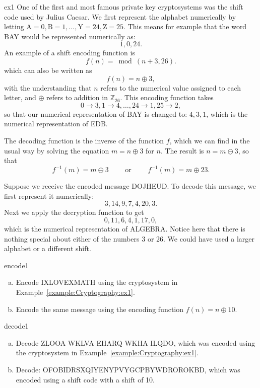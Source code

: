 \begin{example}{ex1}
One of the first and most famous private key cryptosystems was the
shift code used by Julius Caesar.  We first represent the alphabet numerically by
letting $\mbox{A}  = 0, \mbox{B}  = 1, \ldots, \mbox{Y} = 24, \mbox{Z} = 25$. This means for example that the word BAY would be represented numerically as:
$$ 1,0,24.$$
An example of a shift encoding function is
$$
f(n) =\bmod( n + 3,  26).
$$
which can also be written as
$$
f(n) =n \oplus 3,
$$
with the understanding that $n$ refers to the numerical value assigned to each letter, and $\oplus$ refers to addition in $\mathbb{Z}_{26}$. This encoding function takes 
$$0 \rightarrow 3, 1 \rightarrow 4, \ldots, 24 \rightarrow 1,25 \rightarrow 2,$$
so that our numerical representation of BAY is changed to:  $ 4,3,1$, which is the numerical representation of EDB.

The decoding
function is the inverse of the function $f$, which we can find in the usual way by solving the equation $m = n \oplus 3$ for $n$.
The result is $n = m \ominus 3$, so that
$$
f^{-1}(m) = m \ominus 3 \qquad \textrm{ or }\qquad f^{-1}(m) = m \oplus 23.
$$

Suppose we receive the encoded message DOJHEUD. To decode this
message, we first represent it numerically:  
$$
3, 14, 9, 7, 4, 20, 3.
$$
Next we apply the decryption function to get
$$
0, 11, 6, 4, 1, 17, 0,
$$
which is the numerical representation of ALGEBRA. Notice here that there is nothing special about either of
the numbers 3 or 26. We could have used a larger alphabet or a
different shift.
\end{example}

\begin{exercise}{encode1}
\begin{enumerate}[(a)]
\item
Encode IXLOVEXMATH using the cryptosystem in Example~\ref{example:Cryptography:ex1}.
\item
Encode the same message using the encoding function $f(n) =n \oplus 10$.
\end{enumerate}
\end{exercise} 
 \medskip

\begin{exercise}{decode1}
\begin{enumerate}[(a)]
\item
Decode ZLOOA WKLVA EHARQ WKHA ILQDO, which was encoded using the
cryptosystem in Example~\ref{example:Cryptography:ex1}.
\item
Decode: OFOBIDRSXQIYENYPVYGCPBYWDROROKBD, which was encoded using a shift code with a shift of 10.
\end{enumerate}
\end{exercise} 

